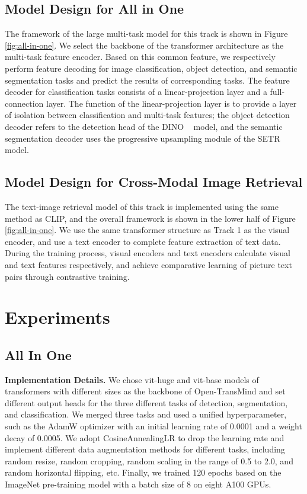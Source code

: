 \documentclass[10pt,twocolumn,letterpaper]{article}
\begin{document}
\subsection{Model Design for All in One}
The framework of the large multi-task model for this track is shown in Figure \ref{fig:all-in-one}. We select the backbone of the transformer architecture as the multi-task feature encoder. Based on this common feature, we respectively perform feature decoding for image classification, object detection, and semantic segmentation tasks and predict the results of corresponding tasks. The feature decoder for classification tasks consists of a linear-projection layer and a full-connection layer. The function of the linear-projection layer is to provide a layer of isolation between classification and multi-task features; the object detection decoder refers to the detection head of the DINO ~\cite{2022DINO} model, and the semantic segmentation decoder uses the progressive upsampling module of the SETR ~\cite{2021Rethinking} model.

\subsection{Model Design for Cross-Modal Image Retrieval}
The text-image retrieval model of this track is implemented using the same method as CLIP, and the overall framework is shown in the lower half of Figure \ref{fig:all-in-one}. We use the same transformer structure as Track 1 as the visual encoder, and use a text encoder to complete feature extraction of text data. During the training process, visual encoders and text encoders calculate visual and text features respectively, and achieve comparative learning of picture text pairs through contrastive training.

\section{Experiments}
\subsection{All In One}
\textbf{Implementation Details.} We chose vit-huge and vit-base models of transformers with different sizes as the backbone of Open-TransMind and set different output heads for the three different tasks of detection, segmentation, and classification. We merged three tasks and used a unified hyperparameter, such as the AdamW optimizer with an initial learning rate of 0.0001 and a weight decay of 0.0005. We adopt CosineAnnealingLR to drop the learning rate and implement different data augmentation methods for different tasks, including random resize, random cropping, random scaling in the range of 0.5 to 2.0, and random horizontal flipping, etc. Finally, we trained 120 epochs based on the ImageNet pre-training model with a batch size of 8 on eight A100 GPUs.
\end{document}
